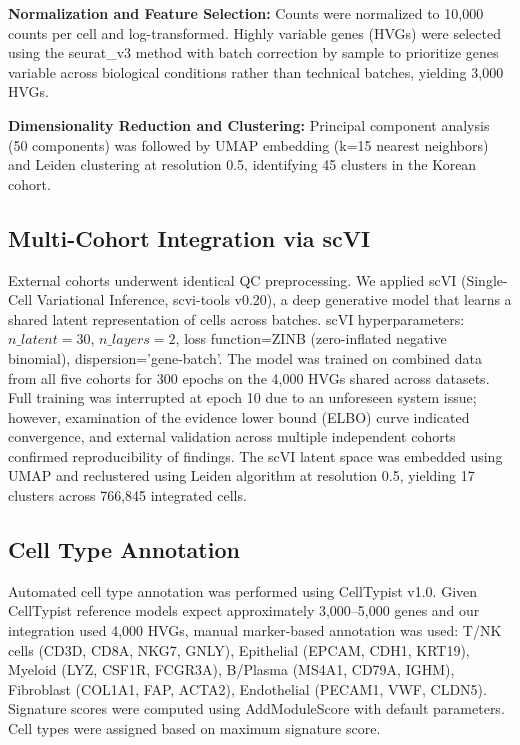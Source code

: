 \documentclass[12pt,twoside]{article}
\begin{document}
\textbf{Normalization and Feature Selection:} Counts were normalized to 10,000 counts per cell and log-transformed. Highly variable genes (HVGs) were selected using the seurat\_v3 method with batch correction by sample to prioritize genes variable across biological conditions rather than technical batches, yielding 3,000 HVGs.

\textbf{Dimensionality Reduction and Clustering:} Principal component analysis (50 components) was followed by UMAP embedding (k=15 nearest neighbors) and Leiden clustering at resolution 0.5, identifying 45 clusters in the Korean cohort.

\subsection{Multi-Cohort Integration via scVI}

External cohorts underwent identical QC preprocessing. We applied scVI (Single-Cell Variational Inference, scvi-tools v0.20), a deep generative model that learns a shared latent representation of cells across batches. scVI hyperparameters: $n\_latent=30$, $n\_layers=2$, loss function=ZINB (zero-inflated negative binomial), dispersion='gene-batch'. The model was trained on combined data from all five cohorts for 300 epochs on the 4,000 HVGs shared across datasets. Full training was interrupted at epoch 10 due to an unforeseen system issue; however, examination of the evidence lower bound (ELBO) curve indicated convergence, and external validation across multiple independent cohorts confirmed reproducibility of findings. The scVI latent space was embedded using UMAP and reclustered using Leiden algorithm at resolution 0.5, yielding 17 clusters across 766,845 integrated cells.

\subsection{Cell Type Annotation}

Automated cell type annotation was performed using CellTypist v1.0. Given CellTypist reference models expect approximately 3,000--5,000 genes and our integration used 4,000 HVGs, manual marker-based annotation was used: T/NK cells (CD3D, CD8A, NKG7, GNLY), Epithelial (EPCAM, CDH1, KRT19), Myeloid (LYZ, CSF1R, FCGR3A), B/Plasma (MS4A1, CD79A, IGHM), Fibroblast (COL1A1, FAP, ACTA2), Endothelial (PECAM1, VWF, CLDN5). Signature scores were computed using AddModuleScore with default parameters. Cell types were assigned based on maximum signature score.
\end{document}
